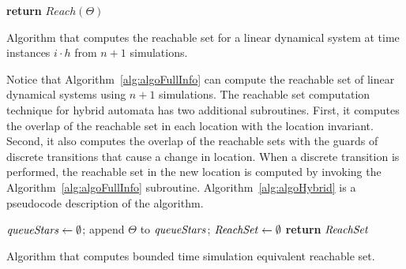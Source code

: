 \begin{algorithm}[h!]
{\bf return} $Reach(\Theta)$\;
\caption{Algorithm that computes the reachable set for a linear dynamical system at time instances $i \cdot h$ from $n+1$ simulations.}
\label{alg:algoFullInfo}
\end{algorithm}

Notice that Algorithm~\ref{alg:algoFullInfo} can compute the reachable set of linear dynamical systems using $n+1$ simulations. 
%
The reachable set computation technique for hybrid automata has two additional subroutines.
%
First, it computes the overlap of the reachable set in each location with the location invariant.
%
Second, it also computes the overlap of the reachable sets with the guards of discrete transitions that cause a change in location.
%
When a discrete transition is performed, the reachable set in the new location is computed by invoking the Algorithm~\ref{alg:algoFullInfo} subroutine.
%
Algorithm~\ref{alg:algoHybrid} is a pseudocode description of the algorithm.

\begin{algorithm}[h!]
${\it queueStars} \gets \emptyset$; append $\Theta$ to ${\it queueStars}$; ${\it ReachSet} \gets \emptyset$\;
{\bf return} ${\it ReachSet}$\;
\caption{Algorithm that computes bounded time simulation equivalent reachable set.}
\label{alg:algoHybrid}
\end{algorithm}





